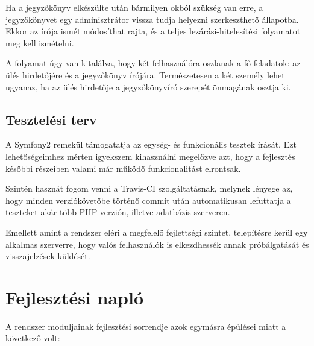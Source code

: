 \documentclass[a4paper,12pt,oneside]{report}
\begin{document}
Ha a jegyzőkönyv elkészülte után bármilyen okból szükség van erre, a jegyzőkönyvet egy adminisztrátor vissza tudja helyezni szerkeszthető állapotba. Ekkor az írója ismét módosíthat rajta, és a teljes lezárási-hitelesítési folyamatot meg kell ismételni.

A folyamat úgy van kitalálva, hogy két felhasználóra oszlanak a fő feladatok: az ülés hirdetőjére és a jegyzőkönyv írójára. Természetesen a két személy lehet ugyanaz, ha az ülés hirdetője a jegyzőkönyvíró szerepét önmagának osztja ki.

\subsection{Tesztelési terv}

A Symfony2 remekül támogatatja az egység- és funkcionális tesztek írását. Ezt lehetőségeimhez mérten igyekszem kihasználni megelőzve azt, hogy a fejlesztés későbbi részeiben valami már működő funkcionalitást elrontsak.

Szintén hasznát fogom venni a Travis-CI szolgáltatásnak, melynek lényege az, hogy minden verziókövetőbe történő commit után automatikusan lefuttatja a teszteket akár több PHP verzión, illetve adatbázis-szerveren.

Emellett amint a rendszer eléri a megfelelő fejlettségi szintet, telepítésre kerül egy alkalmas szerverre, hogy valós felhasználók is elkezdhessék annak próbálgatását és visszajelzések küldését.

\section{Fejlesztési napló}

A rendszer moduljainak fejlesztési sorrendje azok egymásra épülései miatt a következő volt:
\end{document}
